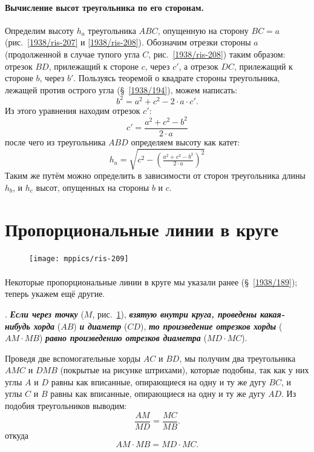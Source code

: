 \documentclass[twoside]{book}
\begin{document}
\paragraph{Вычисление высот треугольника по его сторонам.}\label{1938/198}
Определим высоту $h_a$ треугольника $ABC$, опущенную на сторону $BC=a$ (рис.~\ref{1938/ris-207} и \ref{1938/ris-208}).
Обозначим отрезки стороны $a$ (продолженной в случае тупого угла $C$, рис.~\ref{1938/ris-208}) таким образом:
отрезок $BD$, прилежащий к стороне $c$, через $c'$, а отрезок $DC$, прилежащий к стороне $b$, через $b'$.
Пользуясь теоремой о квадрате стороны треугольника, лежащей против острого угла (§~\ref{1938/194}), можем написать:
\[b^2=a^2+c^2-2\cdot a\cdot c'.\]
Из этого уравнения находим отрезок $c'$:
\[c'=\frac{a^2+c^2-b^2}{2\cdot a}\]
после чего из треугольника $ABD$ определяем высоту как катет:
\[h_a=\sqrt{c^2-\left(\tfrac{a^2+c^2-b^2}{2\cdot a}\right)^2}\]
Таким же путём можно определить в зависимости от сторон треугольника длины $h_b$, и $h_c$ высот, опущенных на стороны $b$ и $c$.

\section{Пропорциональные линии в круге}

\begin{figure}
\vskip-4mm
\centering
\texttt{[image: mppics/ris-209]}
\caption{}\label{1938/ris-209}
\end{figure}

\paragraph{}\label{1938/199}
Некоторые пропорциональные линии в круге мы указали ранее (§~\ref{1938/189});
теперь укажем ещё другие.

\smallskip
\mbox{.}
\textbf{\emph{Если через точку}} ($M$, рис.~\ref{1938/ris-209}), \textbf{\emph{взятую внутри круга, проведены какая-нибудь хорда}} ($AB$) \textbf{\emph{и диаметр}} ($CD$), \textbf{\emph{то произведение отрезков хорды}} ($AM\cdot  MB$) \textbf{\emph{равно произведению отрезков диаметра}} ($MD\cdot  MC$).

Проведя две вспомогательные хорды $AC$ и $BD$, мы получим два треугольника $AMC$ и $DMB$ (покрытые на рисунке штрихами), которые подобны, так как у них углы $A$ и $D$ равны как вписанные, опирающиеся на одну и ту же дугу $BC$, и углы $C$ и $B$ равны как вписанные, опирающиеся на одну и ту же дугу $AD$.
Из подобия треугольников выводим:
\[\frac{AM}{MD}=\frac{MC}{MB}.\]
откуда
\[AM\cdot  MB=MD\cdot  MC.\]
\end{document}
